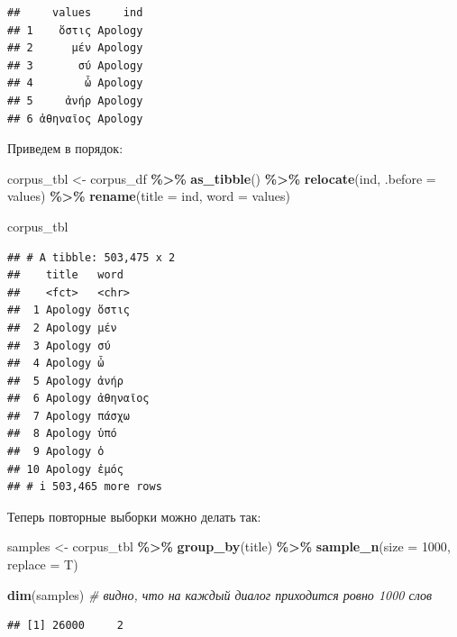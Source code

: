\documentclass[
]{book}
\newenvironment{Shaded}{\begin{snugshade}}{\end{snugshade}}
\newcommand{\AttributeTok}[1]{\textcolor[rgb]{0.13,0.29,0.53}{#1}}
\newcommand{\CommentTok}[1]{\textcolor[rgb]{0.56,0.35,0.01}{\textit{#1}}}
\newcommand{\DecValTok}[1]{\textcolor[rgb]{0.00,0.00,0.81}{#1}}
\newcommand{\FunctionTok}[1]{\textcolor[rgb]{0.13,0.29,0.53}{\textbf{#1}}}
\newcommand{\NormalTok}[1]{#1}
\newcommand{\OtherTok}[1]{\textcolor[rgb]{0.56,0.35,0.01}{#1}}
\newcommand{\SpecialCharTok}[1]{\textcolor[rgb]{0.81,0.36,0.00}{\textbf{#1}}}
\theoremstyle{definition}
\theoremstyle{definition}
\theoremstyle{definition}
\theoremstyle{definition}
\theoremstyle{remark}
\begin{document}
\begin{verbatim}
##     values     ind
## 1    ὅστις Apology
## 2      μέν Apology
## 3       σύ Apology
## 4        ὦ Apology
## 5     ἀνήρ Apology
## 6 ἀθηναῖος Apology
\end{verbatim}

Приведем в порядок:

\begin{Shaded}
\begin{Highlighting}[]
\NormalTok{corpus\_tbl }\OtherTok{\textless{}{-}}\NormalTok{ corpus\_df }\SpecialCharTok{\%\textgreater{}\%} 
  \FunctionTok{as\_tibble}\NormalTok{() }\SpecialCharTok{\%\textgreater{}\%} 
  \FunctionTok{relocate}\NormalTok{(ind, }\AttributeTok{.before =}\NormalTok{ values) }\SpecialCharTok{\%\textgreater{}\%} 
  \FunctionTok{rename}\NormalTok{(}\AttributeTok{title =}\NormalTok{ ind, }
         \AttributeTok{word =}\NormalTok{ values)}

\NormalTok{corpus\_tbl}
\end{Highlighting}
\end{Shaded}

\begin{verbatim}
## # A tibble: 503,475 x 2
##    title   word    
##    <fct>   <chr>   
##  1 Apology ὅστις   
##  2 Apology μέν     
##  3 Apology σύ      
##  4 Apology ὦ       
##  5 Apology ἀνήρ    
##  6 Apology ἀθηναῖος
##  7 Apology πάσχω   
##  8 Apology ὑπό     
##  9 Apology ὁ       
## 10 Apology ἐμός    
## # i 503,465 more rows
\end{verbatim}

Теперь повторные выборки можно делать так:

\begin{Shaded}
\begin{Highlighting}[]
\NormalTok{samples }\OtherTok{\textless{}{-}}\NormalTok{ corpus\_tbl }\SpecialCharTok{\%\textgreater{}\%} 
  \FunctionTok{group\_by}\NormalTok{(title) }\SpecialCharTok{\%\textgreater{}\%} 
  \FunctionTok{sample\_n}\NormalTok{(}\AttributeTok{size =} \DecValTok{1000}\NormalTok{, }\AttributeTok{replace =}\NormalTok{ T)}

\FunctionTok{dim}\NormalTok{(samples) }\CommentTok{\# видно, что на каждый диалог приходится ровно 1000 слов}
\end{Highlighting}
\end{Shaded}

\begin{verbatim}
## [1] 26000     2
\end{verbatim}
\end{document}
